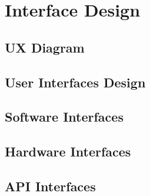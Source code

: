 \chapter{Interface Design}
\section{UX Diagram}
\section{User Interfaces Design}
\section{Software Interfaces}
\section{Hardware Interfaces}
\section{API Interfaces}